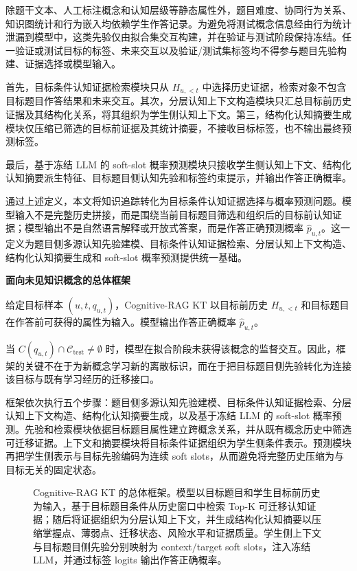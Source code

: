 \documentclass[UTF8,a4paper,12pt]{ctexart}
\numberwithin{table}{section}
\begin{document}
除题干文本、人工标注概念和认知层级等静态属性外，题目难度、协同行为关系、知识图统计和行为嵌入均依赖学生作答记录。为避免将测试概念信息经由行为统计泄漏到模型中，这类先验仅由拟合集交互构建，并在验证与测试阶段保持冻结。任一验证或测试目标的标签、未来交互以及验证/测试集标签均不得参与题目先验构建、证据选择或模型输入。

首先，目标条件认知证据检索模块只从 \(H_{u,<t}\) 中选择历史证据，检索对象不包含目标题目作答结果和未来交互。其次，分层认知上下文构造模块只汇总目标前历史证据及其结构化关系，将其组织为学生侧认知上下文。第三，结构化认知摘要生成模块仅压缩已筛选的目标前证据及其统计摘要，不接收目标标签，也不输出最终预测标签。

最后，基于冻结 LLM 的 soft-slot 概率预测模块只接收学生侧认知上下文、结构化认知摘要派生特征、目标题目侧认知先验和标签约束提示，并输出作答正确概率。

通过上述定义，本文将知识追踪转化为目标条件认知证据选择与概率预测问题。模型输入不是完整历史拼接，而是围绕当前目标题目筛选和组织后的目标前认知证据；模型输出不是自然语言解释或开放式答案，而是作答正确预测概率 \(\hat{p}_{u,t}\)。这一定义为题目侧多源认知先验建模、目标条件认知证据检索、分层认知上下文构造、结构化认知摘要生成和 soft-slot 概率预测提供统一基础。

\noindent\textbf{面向未见知识概念的总体框架}



给定目标样本 \((u,t,q_{u,t})\)，Cognitive-RAG KT 以目标前历史 \(H_{u,<t}\) 和目标题目在作答前可获得的属性为输入。模型输出作答正确概率 \(\hat{p}_{u,t}\)。

当 \(C(q_{u,t})\cap\mathcal{C}_{\mathrm{test}}\neq\emptyset\) 时，模型在拟合阶段未获得该概念的监督交互。因此，框架的关键不在于为新概念学习新的离散标识，而在于把目标题目侧先验转化为连接该目标与既有学习经历的迁移接口。

框架依次执行五个步骤：题目侧多源认知先验建模、目标条件认知证据检索、分层认知上下文构造、结构化认知摘要生成，以及基于冻结 LLM 的 soft-slot 概率预测。先验和检索模块依据目标题目属性建立跨概念关系，并从既有概念历史中筛选可迁移证据。上下文和摘要模块将目标条件证据组织为学生侧条件表示。预测模块再把学生侧表示与目标先验编码为连续 soft slots，从而避免将完整历史压缩为与目标无关的固定状态。

\begin{figure}[t]
    \centering
    
    \caption{Cognitive-RAG KT 的总体框架。模型以目标题目和学生目标前历史为输入，基于目标题目条件从历史窗口中检索 Top-K 可迁移认知证据；随后将证据组织为分层认知上下文，并生成结构化认知摘要以压缩掌握点、薄弱点、迁移状态、风险水平和证据质量。学生侧上下文与目标题目侧先验分别映射为 context/target soft slots，注入冻结 LLM，并通过标签 logits 输出作答正确概率。}
    \label{fig:cognitive-rag-overview}
\end{figure}
\end{document}
